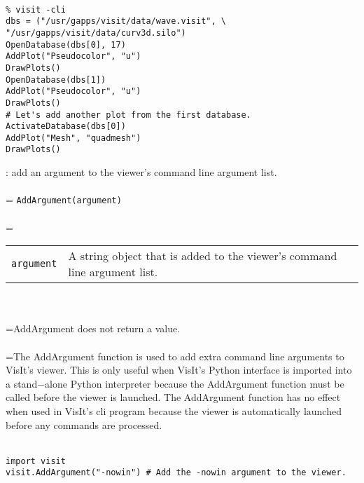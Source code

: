\documentclass[10pt,a4paper]{report}
\begin{document}
\\[-6mm]
\begin{verbatim}% visit -cli
dbs = ("/usr/gapps/visit/data/wave.visit", \
"/usr/gapps/visit/data/curv3d.silo")
OpenDatabase(dbs[0], 17)
AddPlot("Pseudocolor", "u")
DrawPlots()
OpenDatabase(dbs[1])
AddPlot("Pseudocolor", "u")
DrawPlots()
# Let's add another plot from the first database.
ActivateDatabase(dbs[0])
AddPlot("Mesh", "quadmesh")
DrawPlots()
\end{verbatim}
\newpage


{}
: add an argument to the viewer's command line argument list.\\[-3mm]

 \\ 
\hangindent=\parindent 
\verb!AddArgument(argument)!\\ [-3mm]

 \\ 
\hangindent=\parindent 
\begin{tabular}{lp{9cm}}
\verb!argument! & A string object that is added to the viewer's command line argument list. \\
\end{tabular} \\[-2mm]


 \\ 
\hangindent=\parindent AddArgument does not return a value. \\[-3mm] 

 \\ 
\hangindent=\parindent The AddArgument function is used to add extra command line arguments to VisIt's viewer. This is only useful when VisIt's Python interface is imported into a stand$-$alone Python interpreter because the AddArgument function must be called before the viewer is launched. The AddArgument function has no effect when used in VisIt's cli program because the viewer is automatically launched before any commands are processed. \\[-3mm] 

\\[-6mm]
\begin{verbatim}import visit
visit.AddArgument("-nowin") # Add the -nowin argument to the viewer.
\end{verbatim}
\newpage
\end{document}
